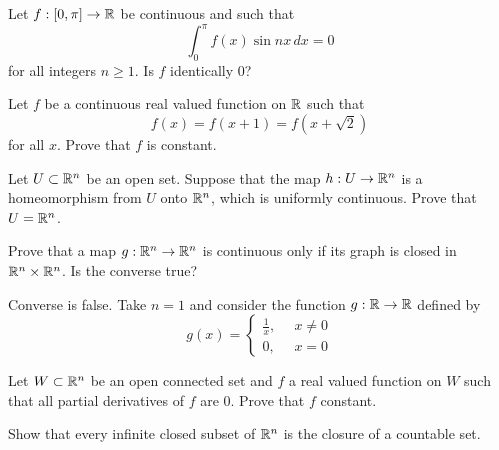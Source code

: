 \question[Su82] Let $f:[0,\pi]\to\mathbb{R}$ be continuous and such that
$$\int_{0}^{\pi}{f(x)\sin{nx}\,dx}=0$$
for all integers $n\geq 1$. Is $f$ identically 0?

\question[Sp86] Let $f$ be a continuous real valued function on $\mathbb{R}$ such that
$$f(x)=f(x+1)=f(x+\sqrt{2})$$
for all $x$. Prove that $f$ is constant.

\question[Su79] Let $U\subset\mathbb{R}^n$ be an open set. Suppose that the map $h:U\to\mathbb{R}^n$ is a homeomorphism from $U$ onto $\mathbb{R}^n$, which is uniformly continuous. Prove that $U=\mathbb{R}^n$.

\question[Sp78] Prove that a map $g:\mathbb{R}^n\to\mathbb{R}^n$ is continuous only if its graph is closed in $\mathbb{R}^n\times\mathbb{R}^n$. Is the converse true?
\begin{solution}
    Converse is false. Take $n=1$ and consider the function $g:\mathbb{R}\to\mathbb{R}$ defined by
    $$g(x)=\begin{cases}
        \frac{1}{x},\,\,\,&x\neq 0\\
        0,& x=0
    \end{cases}$$
\end{solution}

\question[Fa78] Let $W\subset\mathbb{R}^n$ be an open connected set and $f$ a real valued function on $W$ such that all partial derivatives of $f$ are 0. Prove that $f$ constant.

\question[Sp92, Fa99] Show that every infinite closed subset of $\mathbb{R}^n$ is the closure of a countable set.